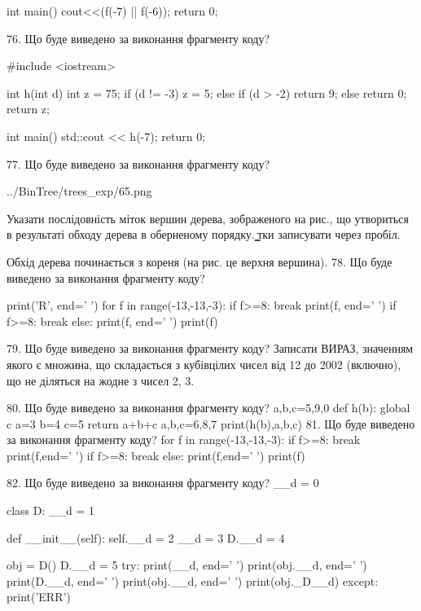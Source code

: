 \documentclass[11pt]{article}
\begin{document}
int main(){
    cout<<(f(-7) || f(-6));
    return 0;
}

76. Що буде виведено за виконання фрагменту коду?

#include <iostream>

int h(int d){
    int z = 75;
    if (d != -3) 
        z = 5;
    else if (d > -2)
         return 9;
    else
         return 0;
    return z;
}

int main(){
    std::cout << h(-7);
    return 0;
}


77. Що буде виведено за виконання фрагменту коду?

\begin{center}
	{../BinTree/trees_exp/65.png}
\end{center}
Указати послідовність міток вершин дерева, зображеного на рис., що утвориться в результаті обходу дерева в оберненому порядку. ̳тки записувати через пробіл.\par Обхід дерева починається з кореня (на рис. це верхня вершина).
78. Що буде виведено за виконання фрагменту коду?

print('R', end=' ')
for f in range(-13,-13,-3):
    if f>=8:
        break
        print(f, end=' ')
    if f>=8:
        break
    else:
        print(f, end=' ')
    print(f)

79. Що буде виведено за виконання фрагменту коду?
Записати ВИРАЗ, значенням якого є множина, що складається з кубівцілих чисел від 12 до 2002 (включно), що не діляться на жодне з чисел 2, 3.

80. Що буде виведено за виконання фрагменту коду?
a,b,c=5,9,0
   def h(b):
     global c     a=3
     b=4
     c=5
     return a+b+c
   a,b,c=6,8,7
   print(h(b),a,b,c)
81. Що буде виведено за виконання фрагменту коду?
for f in range(-13,-13,-3):
    if f>=8:
        break
        print(f,end=' ')
    if f>=8:
        break
    else:
        print(f,end=' ')
    print(f)

82. Що буде виведено за виконання фрагменту коду?
__d = 0

class D:
    __d = 1
    
    def __init__(self):
        self.__d = 2
        __d = 3
        D.__d = 4

obj = D()
D.__d = 5
try:
    print(__d, end=' ')
    print(obj.__d, end=' ')
    print(D.__d, end=' ')
    print(obj.__d, end=' ')
    print(obj._D__d)
except:
    print('ERR')
\end{document}
